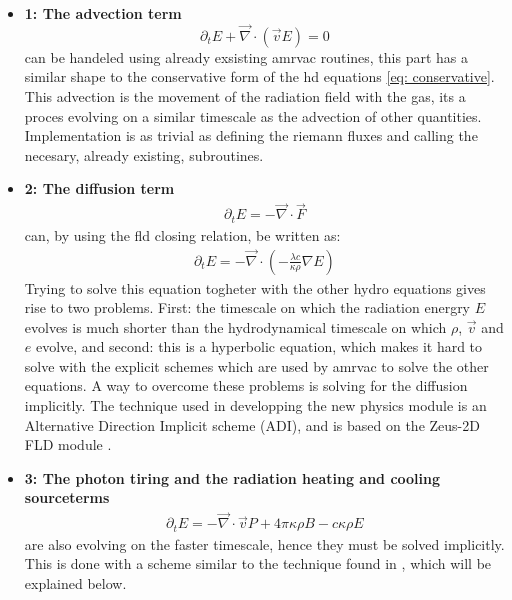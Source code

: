 \begin{itemize}
\item \textbf{1: The advection term}
\begin{equation}
\partial_t E + \vec{\nabla} \cdot \left( \vec{v} E \right) = 0
\end{equation}
can be handeled using already exsisting amrvac routines, this part has a similar shape to the conservative form of the hd equations \eqref{eq: conservative}. This advection is the movement of the radiation field with the gas, its a proces evolving on a similar timescale as the advection of other quantities. Implementation is as trivial as defining the riemann fluxes and calling the necesary, already existing, subroutines.\\

\item \textbf{2: The diffusion term}
\begin{align}
\partial_t E = - \vec{\nabla} \cdot \vec{F}
\end{align}
can, by using the fld closing relation, be written as:
\begin{align}
\partial_t E = - \vec{\nabla} \cdot \left( -\frac{\lambda c}{\kappa \rho} \nabla E\right)
\end{align}
Trying to solve this equation togheter with the other hydro equations gives rise to two problems. First: the timescale on which the radiation energry $E$ evolves is much shorter than the hydrodynamical timescale on which $\rho$, $\vec{v}$ and $e$ evolve, and second: this is a hyperbolic equation, which makes it hard to solve with the explicit schemes which are used by amrvac to solve the other equations. A way to overcome these problems is solving for the diffusion implicitly. The technique used in developping the new physics module is an Alternative Direction Implicit scheme (ADI), and is based on the Zeus-2D FLD module \cite{Turener12001}.\\

\item \textbf{3: The photon tiring and the radiation heating and cooling sourceterms}
\begin{align}
\partial_t E = - \vec{\nabla} \cdot \vec{v} P + 4\pi \kappa\rho B - c \kappa \rho E
\end{align}
are also evolving on the faster timescale, hence they must be solved implicitly. This is done with a scheme similar to the technique found in \cite{Turner12001}, which will be explained below.
\end{itemize}

